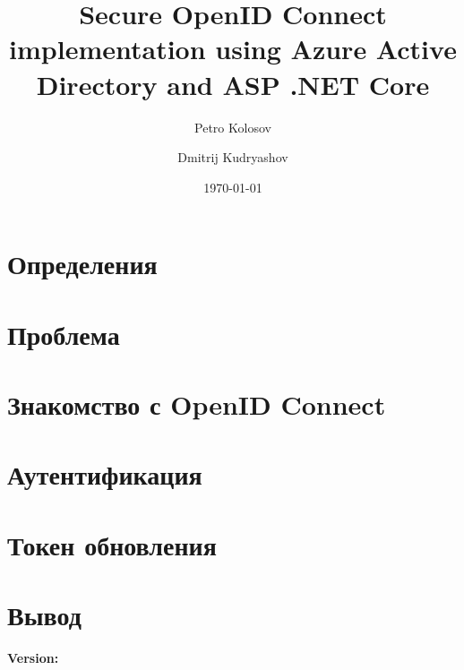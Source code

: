 \documentclass[12pt,letterpaper,oneside,reqno]{amsart}
\title[Secure OIDC implementation using Azure AD and ASP .NET Core]
{Secure OpenID Connect implementation using Azure Active Directory and ASP .NET Core}
\author[Petro Kolosov]{Petro Kolosov}
\author[Dmitrij Kudryashov]{Dmitrij Kudryashov}
\date{\today}
\numberwithin{equation}{section}
\begin{document}
    \begin{abstract}
        
    \end{abstract}

    \maketitle

    \tableofcontents


    \section{Определения}\label{sec:definitions}
    


    \section{Проблема}\label{sec:statement-of-the-problem}
    


    \section{Знакомство с OpenID Connect}\label{sec:introduction-to-open-id-connect}
    


    \section{Аутентификация}\label{sec:authentication-flow}
    


    \section{Токен обновления}\label{sec:refresh-token-flow}
    


    \section{Вывод}\label{sec:conclusions}
    

    
    
    \noindent \textbf{Version:} 
\end{document}
